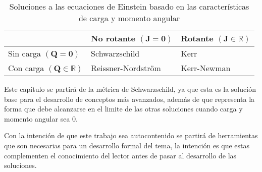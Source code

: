 \begin{table}
    \begin{small}
        \caption{Soluciones a las ecuaciones de Einstein basado en las características de carga y momento angular}
        \begin{center}
            \begin{tabular}{|l|l|l|}
                \hline                                             & No rotante $(\boldsymbol{J}=\mathbf{0})$ & Rotante $(\boldsymbol{J} \in \mathbb{R})$ \\
                \hline Sin carga $(\boldsymbol{Q}=\mathbf{0})$     & Schwarzschild                            & Kerr                                      \\
                \hline Con carga $(\boldsymbol{Q} \in \mathbb{R})$ & Reissner-Nordström                       & Kerr-Newman                               \\
                \hline
            \end{tabular}
        \end{center}
    \end{small}
\end{table}


Este capítulo se partirá de la métrica de Schwarzschild, ya que esta es la solución base para el desarrollo de conceptos más avanzados, además de que representa la forma que debe alcanzarse en el limite de las otras soluciones cuando carga y momento angular sea $0$.

Con la intención de que este trabajo sea autocontenido se partirá de herramientas que son necesarias para un desarrollo formal del tema, la intención es que estas complementen el conocimiento del lector antes de pasar al desarrollo de las soluciones.







\printbibliography[keyword={BlackHoles},title={Referencias del capítulo}]
